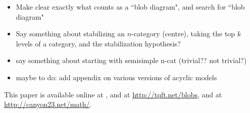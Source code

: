 \documentclass[11pt,leqno]{article}
\begin{document}
{\begin{itemize}
\item Make clear exactly what counts as a ``blob diagram", and search for
``blob diagram"

\item Say something about stabilizing an $n$-category (centre), taking the top $k$ levels of a category, and the stabilization hypothesis?

\item say something about starting with semisimple n-cat (trivial?? not trivial?)

\item maybe to do: add appendix on various versions of acyclic models


\end{itemize}

}  %

\tableofcontents




















\appendix












This paper is available online at , and at
\url{http://tqft.net/blobs},
and at \url{http://canyon23.net/math/}.

\end{document}
